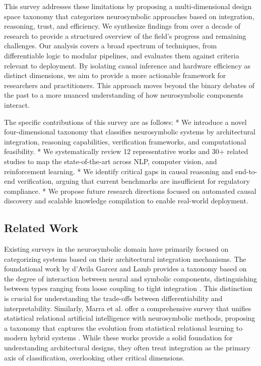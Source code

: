 \documentclass{article}
\begin{document}
This survey addresses these limitations by proposing a multi-dimensional design space taxonomy that categorizes neurosymbolic approaches based on integration, reasoning, trust, and efficiency. We synthesize findings from over a decade of research to provide a structured overview of the field's progress and remaining challenges. Our analysis covers a broad spectrum of techniques, from differentiable logic to modular pipelines, and evaluates them against criteria relevant to deployment. By isolating causal inference and hardware efficiency as distinct dimensions, we aim to provide a more actionable framework for researchers and practitioners. This approach moves beyond the binary debates of the past to a more nuanced understanding of how neurosymbolic components interact.

The specific contributions of this survey are as follows:
* We introduce a novel four-dimensional taxonomy that classifies neurosymbolic systems by architectural integration, reasoning capabilities, verification frameworks, and computational feasibility.
* We systematically review 12 representative works and 30+ related studies to map the state-of-the-art across NLP, computer vision, and reinforcement learning.
* We identify critical gaps in causal reasoning and end-to-end verification, arguing that current benchmarks are insufficient for regulatory compliance.
* We propose future research directions focused on automated causal discovery and scalable knowledge compilation to enable real-world deployment.

\subsection{Related Work}

\label{sec:related_work}

Existing surveys in the neurosymbolic domain have primarily focused on categorizing systems based on their architectural integration mechanisms. The foundational work by d'Avila Garcez and Lamb provides a taxonomy based on the degree of interaction between neural and symbolic components, distinguishing between types ranging from loose coupling to tight integration \cite{garcez2020neurosymbolic}. This distinction is crucial for understanding the trade-offs between differentiability and interpretability. Similarly, Marra et al. offer a comprehensive survey that unifies statistical relational artificial intelligence with neurosymbolic methods, proposing a taxonomy that captures the evolution from statistical relational learning to modern hybrid systems \cite{marra2024statistical}. While these works provide a solid foundation for understanding architectural designs, they often treat integration as the primary axis of classification, overlooking other critical dimensions.
\end{document}
